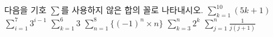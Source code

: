다음을 기호 $\sum$를 사용하지 않은 합의 꼴로 나타내시오.
 $\displaystyle\sum_{k=1}^{10}(5k+1)$
 $\displaystyle\sum_{i=1}^{7}3^{i-1}$
 $\displaystyle\sum_{k=1}^{6}3$
 $\displaystyle\sum_{n=1}^{8}\{(-1)^n\times n\}$
 $\displaystyle\sum_{k=3}^{n}2^k$
 $\displaystyle\sum_{j=1}^{n}\frac{1}{j(j+1)}$
